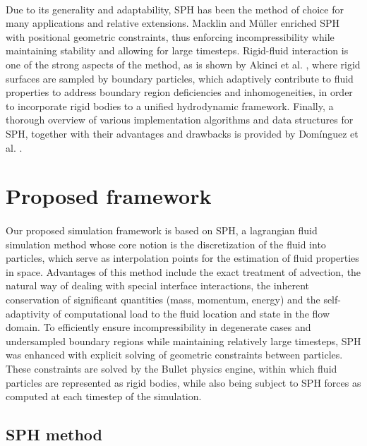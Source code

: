 \documentclass{llncs}
\begin{document}
\paragraph{} Due to its generality and adaptability, SPH has been the method of choice for
many applications and relative extensions. Macklin and M\"{u}ller
\cite{macklin2013position} enriched SPH with positional geometric constraints, thus
enforcing incompressibility while maintaining stability and allowing for large
timesteps. Rigid-fluid interaction is one of the strong aspects of the method, as is shown
by Akinci et al. \cite{akinci2012versatile}, where rigid surfaces are sampled by boundary
particles, which adaptively contribute to fluid properties to address boundary region
deficiencies and inhomogeneities, in order to incorporate rigid bodies to a unified
hydrodynamic framework. Finally, a thorough overview of various implementation algorithms
and data structures for SPH, together with their advantages and drawbacks is provided by
Dom\'{i}nguez et al. \cite{dominguez2011}.

\section{Proposed framework}

\paragraph{} Our proposed simulation framework is based on SPH, a lagrangian fluid
simulation method whose core notion is the discretization of the fluid into particles,
which serve as interpolation points for the estimation of fluid properties in
space. Advantages of this method include the exact treatment of advection, the natural way
of dealing with special interface interactions, the inherent conservation of significant
quantities (mass, momentum, energy) and the self-adaptivity of computational load to the
fluid location and state in the flow domain. To efficiently ensure incompressibility in
degenerate cases and undersampled boundary regions while maintaining relatively large
timesteps, SPH was enhanced with explicit solving of geometric constraints between
particles. These constraints are solved by the Bullet physics engine, within which fluid
particles are represented as rigid bodies, while also being subject to SPH forces as
computed at each timestep of the simulation.

\subsection{SPH method}
\end{document}
